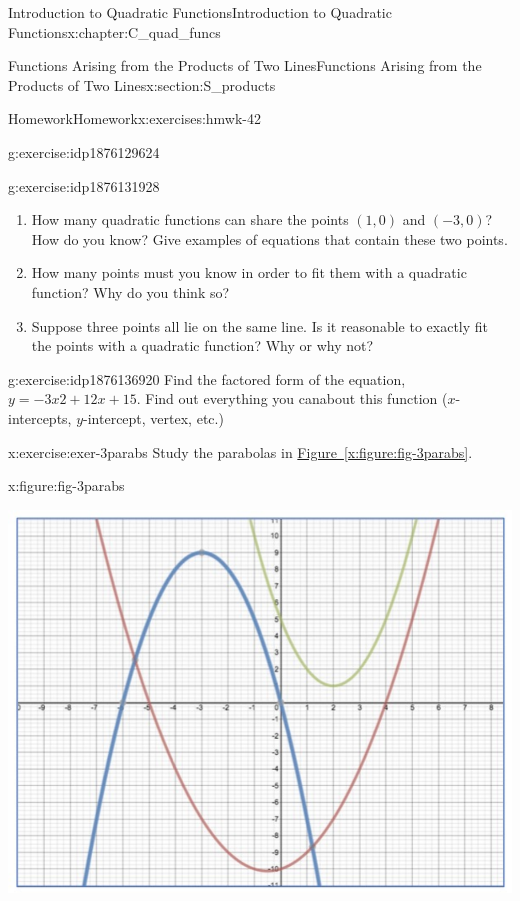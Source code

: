 \documentclass[oneside,10pt,]{book}
\newcommand{\xreffont}{\relax}
\numberwithin{equation}{chapter}
\begin{document}
\begin{chapterptx}{Introduction to Quadratic Functions}{}{Introduction to Quadratic Functions}{}{}{x:chapter:C_quad_funcs}
\begin{sectionptx}{Functions Arising from the Products of Two Lines}{}{Functions Arising from the Products of Two Lines}{}{}{x:section:S_products}
\begin{exercises-subsection}{Homework}{}{Homework}{}{}{x:exercises:hmwk-42}
\begin{divisionexercise}{5}{}{}{g:exercise:idp1876129624}
\begin{enumerate}[font=\bfseries,label=(\alph*),ref=\alph*]
\end{enumerate}
\end{divisionexercise}%
\begin{divisionexercise}{6}{}{}{g:exercise:idp1876131928}%
\begin{enumerate}[font=\bfseries,label=(\alph*),ref=\alph*]
\item{}How many quadratic functions can share the points \((1, 0)\) and \((-3, 0)\)? How do you know? Give examples of equations that contain these two points.%
\item{}How many points must you know in order to fit them with a quadratic function? Why do you think so?%
\item{}Suppose three points all lie on the same line. Is it reasonable to exactly fit the points with a quadratic function? Why or why not?%
\end{enumerate}
\end{divisionexercise}%
\begin{divisionexercise}{7}{}{}{g:exercise:idp1876136920}%
Find the factored form of the equation, \(y = -3x2 + 12x + 15\). Find out everything you canabout this function (\(x\)-intercepts, \(y\)-intercept, vertex, etc.)%
\end{divisionexercise}%
\begin{divisionexercise}{8}{}{}{x:exercise:exer-3parabs}%
Study the parabolas in \hyperref[x:figure:fig-3parabs]{Figure~{\xreffont\ref{x:figure:fig-3parabs}}}.%
\begin{figureptx}{}{x:figure:fig-3parabs}{}%
\begin{image}{0.15}{0.7}{0.15}%
\includegraphics[width=\linewidth]{external/3parabs.pdf}

\end{image}
\end{figureptx}
\end{divisionexercise}
\end{exercises-subsection}
\end{sectionptx}
\end{chapterptx}
\end{document}

